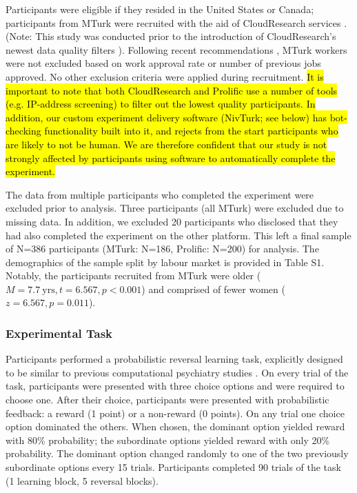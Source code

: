 \documentclass[a4paper,notitlepage,12pt]{article}
\begin{document}
\begin{refsection}[main]
Participants were eligible if they resided in the United States or Canada; participants from MTurk were recruited with the aid of CloudResearch services \cite{litman2017turkprime}. (Note: This study was conducted prior to the introduction of CloudResearch's newest data quality filters \cite{cloudresearch_2020}). Following recent recommendations \cite{robinson2019tapped}, MTurk workers were not excluded based on work approval rate or number of previous jobs approved. No other exclusion criteria were applied during recruitment. \hl{It is important to note that both CloudResearch and Prolific use a number of tools (e.g. IP-address screening) to filter out the lowest quality participants. In addition, our custom experiment delivery software (NivTurk; see below) has bot-checking functionality built into it, and rejects from the start participants who are likely to not be human. We are therefore confident that our study is not strongly affected by participants using software to automatically complete the experiment.}

The data from multiple participants who completed the experiment were excluded prior to analysis. Three participants (all MTurk) were excluded due to missing data. In addition, we excluded 20 participants who disclosed that they had also completed the experiment on the other platform. This left a final sample of N=386 participants (MTurk: N=186, Prolific: N=200) for analysis. The demographics of the sample split by labour market is provided in Table S1. Notably, the participants recruited from MTurk were older ($M = 7.7 \ \text{yrs}, t = 6.567, p < 0.001$) and comprised of fewer women ($z = 6.567, p = 0.011$). 

\subsubsection{Experimental Task}

Participants performed a probabilistic reversal learning task, explicitly designed to be similar to previous computational psychiatry studies \cite{waltz2007probabilistic, mukherjee_reward_2020}. On every trial of the task, participants were presented with three choice options and were required to choose one. After their choice, participants were presented with probabilistic feedback: a reward (1 point) or a non-reward (0 points). On any trial one choice option dominated the others. When chosen, the dominant option yielded reward with 80\% probability; the subordinate options yielded reward with only 20\% probability. The dominant option changed randomly to one of the two previously subordinate options every 15 trials. Participants completed 90 trials of the task (1 learning block, 5 reversal blocks). 


\end{refsection}
\end{document}
